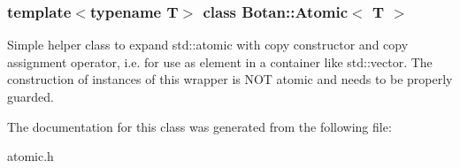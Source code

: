 \subsubsection*{template$<$typename T$>$\newline
class Botan\+::\+Atomic$<$ T $>$}

Simple helper class to expand std\+::atomic with copy constructor and copy assignment operator, i.\+e. for use as element in a container like std\+::vector. The construction of instances of this wrapper is N\+OT atomic and needs to be properly guarded. 

The documentation for this class was generated from the following file\+:\begin{DoxyCompactItemize}
\item 
atomic.\+h\end{DoxyCompactItemize}
